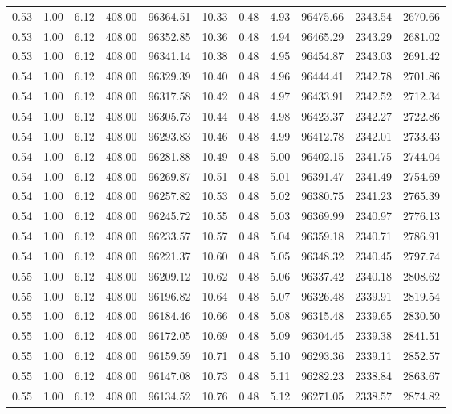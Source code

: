 \begin{table}[!ht]
\begin{tabular}{rrrrrrrrrrr}
0.53 & 1.00 & 6.12 & 408.00 & 96364.51 & 10.33 & 0.48 & 4.93 & 96475.66 & 2343.54 & 2670.66 \\
0.53 & 1.00 & 6.12 & 408.00 & 96352.85 & 10.36 & 0.48 & 4.94 & 96465.29 & 2343.29 & 2681.02 \\
0.53 & 1.00 & 6.12 & 408.00 & 96341.14 & 10.38 & 0.48 & 4.95 & 96454.87 & 2343.03 & 2691.42 \\
0.54 & 1.00 & 6.12 & 408.00 & 96329.39 & 10.40 & 0.48 & 4.96 & 96444.41 & 2342.78 & 2701.86 \\
0.54 & 1.00 & 6.12 & 408.00 & 96317.58 & 10.42 & 0.48 & 4.97 & 96433.91 & 2342.52 & 2712.34 \\
0.54 & 1.00 & 6.12 & 408.00 & 96305.73 & 10.44 & 0.48 & 4.98 & 96423.37 & 2342.27 & 2722.86 \\
0.54 & 1.00 & 6.12 & 408.00 & 96293.83 & 10.46 & 0.48 & 4.99 & 96412.78 & 2342.01 & 2733.43 \\
0.54 & 1.00 & 6.12 & 408.00 & 96281.88 & 10.49 & 0.48 & 5.00 & 96402.15 & 2341.75 & 2744.04 \\
0.54 & 1.00 & 6.12 & 408.00 & 96269.87 & 10.51 & 0.48 & 5.01 & 96391.47 & 2341.49 & 2754.69 \\
0.54 & 1.00 & 6.12 & 408.00 & 96257.82 & 10.53 & 0.48 & 5.02 & 96380.75 & 2341.23 & 2765.39 \\
0.54 & 1.00 & 6.12 & 408.00 & 96245.72 & 10.55 & 0.48 & 5.03 & 96369.99 & 2340.97 & 2776.13 \\
0.54 & 1.00 & 6.12 & 408.00 & 96233.57 & 10.57 & 0.48 & 5.04 & 96359.18 & 2340.71 & 2786.91 \\
0.54 & 1.00 & 6.12 & 408.00 & 96221.37 & 10.60 & 0.48 & 5.05 & 96348.32 & 2340.45 & 2797.74 \\
0.55 & 1.00 & 6.12 & 408.00 & 96209.12 & 10.62 & 0.48 & 5.06 & 96337.42 & 2340.18 & 2808.62 \\
0.55 & 1.00 & 6.12 & 408.00 & 96196.82 & 10.64 & 0.48 & 5.07 & 96326.48 & 2339.91 & 2819.54 \\
0.55 & 1.00 & 6.12 & 408.00 & 96184.46 & 10.66 & 0.48 & 5.08 & 96315.48 & 2339.65 & 2830.50 \\
0.55 & 1.00 & 6.12 & 408.00 & 96172.05 & 10.69 & 0.48 & 5.09 & 96304.45 & 2339.38 & 2841.51 \\
0.55 & 1.00 & 6.12 & 408.00 & 96159.59 & 10.71 & 0.48 & 5.10 & 96293.36 & 2339.11 & 2852.57 \\
0.55 & 1.00 & 6.12 & 408.00 & 96147.08 & 10.73 & 0.48 & 5.11 & 96282.23 & 2338.84 & 2863.67 \\
0.55 & 1.00 & 6.12 & 408.00 & 96134.52 & 10.76 & 0.48 & 5.12 & 96271.05 & 2338.57 & 2874.82 \\

\end{tabular}
\end{table}
